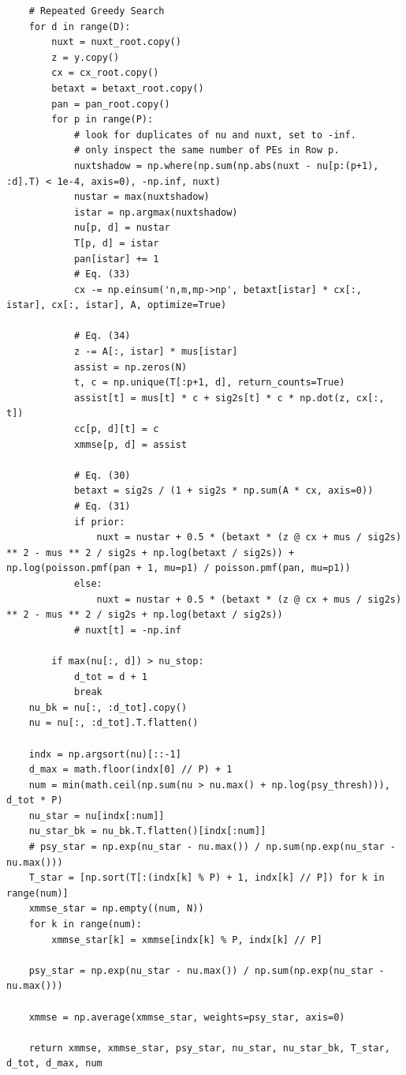\documentclass[notitlepage]{article}
\begin{document}
\begin{lstlisting}
    # Repeated Greedy Search
    for d in range(D):
        nuxt = nuxt_root.copy()
        z = y.copy()
        cx = cx_root.copy()
        betaxt = betaxt_root.copy()
        pan = pan_root.copy()
        for p in range(P):
            # look for duplicates of nu and nuxt, set to -inf.
            # only inspect the same number of PEs in Row p.
            nuxtshadow = np.where(np.sum(np.abs(nuxt - nu[p:(p+1), :d].T) < 1e-4, axis=0), -np.inf, nuxt)
            nustar = max(nuxtshadow)
            istar = np.argmax(nuxtshadow)
            nu[p, d] = nustar
            T[p, d] = istar
            pan[istar] += 1
            # Eq. (33)
            cx -= np.einsum('n,m,mp->np', betaxt[istar] * cx[:, istar], cx[:, istar], A, optimize=True)

            # Eq. (34)
            z -= A[:, istar] * mus[istar]
            assist = np.zeros(N)
            t, c = np.unique(T[:p+1, d], return_counts=True)
            assist[t] = mus[t] * c + sig2s[t] * c * np.dot(z, cx[:, t])
            cc[p, d][t] = c
            xmmse[p, d] = assist

            # Eq. (30)
            betaxt = sig2s / (1 + sig2s * np.sum(A * cx, axis=0))
            # Eq. (31)
            if prior:
                nuxt = nustar + 0.5 * (betaxt * (z @ cx + mus / sig2s) ** 2 - mus ** 2 / sig2s + np.log(betaxt / sig2s)) + np.log(poisson.pmf(pan + 1, mu=p1) / poisson.pmf(pan, mu=p1))
            else:
                nuxt = nustar + 0.5 * (betaxt * (z @ cx + mus / sig2s) ** 2 - mus ** 2 / sig2s + np.log(betaxt / sig2s))
            # nuxt[t] = -np.inf

        if max(nu[:, d]) > nu_stop:
            d_tot = d + 1
            break
    nu_bk = nu[:, :d_tot].copy()
    nu = nu[:, :d_tot].T.flatten()

    indx = np.argsort(nu)[::-1]
    d_max = math.floor(indx[0] // P) + 1
    num = min(math.ceil(np.sum(nu > nu.max() + np.log(psy_thresh))), d_tot * P)
    nu_star = nu[indx[:num]]
    nu_star_bk = nu_bk.T.flatten()[indx[:num]]
    # psy_star = np.exp(nu_star - nu.max()) / np.sum(np.exp(nu_star - nu.max()))
    T_star = [np.sort(T[:(indx[k] % P) + 1, indx[k] // P]) for k in range(num)]
    xmmse_star = np.empty((num, N))
    for k in range(num):
        xmmse_star[k] = xmmse[indx[k] % P, indx[k] // P]

    psy_star = np.exp(nu_star - nu.max()) / np.sum(np.exp(nu_star - nu.max()))

    xmmse = np.average(xmmse_star, weights=psy_star, axis=0)

    return xmmse, xmmse_star, psy_star, nu_star, nu_star_bk, T_star, d_tot, d_max, num
\end{lstlisting}
\end{document}
